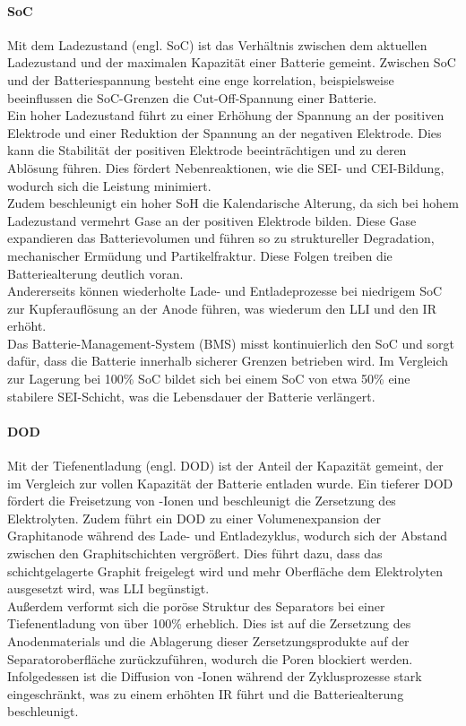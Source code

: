 \paragraph{\acs{SoC}} Mit dem Ladezustand (engl. \ac{SoC}) ist das Verhältnis zwischen dem aktuellen Ladezustand und der maximalen Kapazität einer Batterie gemeint. Zwischen \acs{SoC} und der Batteriespannung besteht eine enge korrelation, beispielsweise beeinflussen die \acs{SoC}-Grenzen die Cut-Off-Spannung einer Batterie.\\
Ein hoher Ladezustand führt zu einer Erhöhung der Spannung an der positiven Elektrode und einer Reduktion der Spannung an der negativen Elektrode. Dies kann die Stabilität der positiven Elektrode beeinträchtigen und zu deren Ablösung führen. Dies fördert Nebenreaktionen, wie die \acs{SEI}- und \acs{CEI}-Bildung, wodurch sich die Leistung minimiert.\\
Zudem beschleunigt ein hoher \acs{SoH} die Kalendarische Alterung, da sich bei hohem Ladezustand vermehrt Gase an der positiven Elektrode bilden. Diese Gase expandieren das Batterievolumen und führen so zu struktureller Degradation, mechanischer Ermüdung und Partikelfraktur. Diese Folgen treiben die Batteriealterung deutlich voran.
\\
Andererseits können wiederholte Lade- und Entladeprozesse bei niedrigem \acs{SoC} zur Kupferauflösung an der Anode führen, was wiederum den \acs{LLI} und den \acs{IR} erhöht.\\
Das Batterie-Management-System (BMS) misst kontinuierlich den \acs{SoC} und sorgt dafür, dass die Batterie innerhalb sicherer Grenzen betrieben wird. Im Vergleich zur Lagerung bei 100\% \acs{SoC} bildet sich bei einem \acs{SoC} von etwa 50\% eine stabilere \acs{SEI}-Schicht, was die Lebensdauer der Batterie verlängert.

\paragraph{DOD} Mit der Tiefenentladung (engl. \ac{DOD})  ist der Anteil der Kapazität gemeint, der im Vergleich zur vollen Kapazität der Batterie entladen wurde. Ein tieferer \acs{DOD} fördert die Freisetzung von -Ionen und beschleunigt die Zersetzung des Elektrolyten. Zudem führt ein \acs{DOD} zu einer Volumenexpansion der Graphitanode während des Lade- und Entladezyklus, wodurch sich der Abstand zwischen den Graphitschichten vergrößert. Dies führt dazu, dass das schichtgelagerte Graphit freigelegt wird und mehr Oberfläche dem Elektrolyten ausgesetzt wird, was \acs{LLI} begünstigt.\\
Außerdem verformt sich die poröse Struktur des Separators bei einer Tiefenentladung von über 100\% erheblich. Dies ist auf die Zersetzung des Anodenmaterials und die Ablagerung dieser Zersetzungsprodukte auf der Separatoroberfläche zurückzuführen, wodurch die Poren blockiert werden. Infolgedessen ist die Diffusion von -Ionen während der Zyklusprozesse stark eingeschränkt, was zu einem erhöhten \acs{IR} führt und die Batteriealterung beschleunigt.

